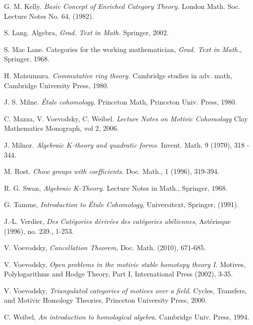 \begin{thebibliography}{10}
G. M. Kelly.
\emph{Basic Concept of Enriched Category Theory.}
London Math. Soc. Lecture Notes No. 64, (1982).

S. Lang.
Algebra, {\em Grad. Text in Math.}
Springer, 2002.

S. Mac Lane.
Categories for the working mathematician, 
{\em Grad. Text in Math.,} Springer, 1968.

H. Matsumura.
\emph{Commutative ring theory.}
Cambridge studies in adv. math,
Cambridge University Press, 1980.

J. S. Milne.
\emph{\'Etale cohomology.} 
Princeton Math,
Princeton Univ. Press, 1980.

C. Mazza, V. Voevodsky, C. Weibel.
\emph{Lecture Notes on Motivic Cohomology}
Clay Mathematics Monograph, vol 2, 2006.

J. Milnor.
\emph{Algebraic $K$-theory and quadratic forms.}
Invent. Math. 9 (1970), 318 - 344.

M. Rost.
\emph{Chow groups with coefficients.}
Doc. Math., 1 (1996), 319-394.

R. G. Swan,
\emph{Algebraic K-Theory.}
Lecture Notes in Math.,
Springer, 1968.

G. Tamme,
\emph{Introduction to \'Etale Cohomology},
Universitext,
Springer, (1991).

J.-L. Verdier, \emph{Des Cat\'egories d\'eriv\'ees des cat\'egories
ab\'eliennes},
Ast\'erisque (1996), no. 239., 1-253.

V. Voevodsky,
\emph{Cancellation Theorem},
Doc. Math. (2010), 671-685.

V. Voevodsky,
{\em Open problems in the motivic stable homotopy theory I.}
Motives, Polylogarithms and Hodge Theory, Part I,
International Press (2002), 3-35.

V. Voevodsky,
\emph{Triangulated categories of motives over a field.}
Cycles, Transfers, and Motivic Homology Theories,
Princeton University Press, 2000.

C. Weibel,
\emph{An introduction to homological algebra.}
Cambridge Univ. Press, 1994.
\end{thebibliography}
